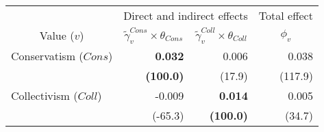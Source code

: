 
\begin{tabular}{lrrr}
\toprule
\multicolumn{1}{c}{ } & \multicolumn{2}{c}{Direct and indirect effects} & \multicolumn{1}{c}{Total effect} \\
\cmidrule(l{3pt}r{3pt}){2-3} \cmidrule(l{3pt}r{3pt}){4-4}
\multicolumn{1}{c}{Value ($v$)} & \multicolumn{1}{c}{$\widetilde{\gamma}^{Cons}_v \times \theta_{Cons}$} & \multicolumn{1}{c}{$\widetilde{\gamma}^{Coll}_v \times \theta_{Coll}$} & \multicolumn{1}{c}{${\phi}_v$}\\
\midrule
Conservatism ($Cons$) & \textbf{0.032} & 0.006 & 0.038\\
 & \textbf{(100.0)} & (17.9) & (117.9)\\
Collectivism ($Coll$) & -0.009 & \textbf{0.014} & 0.005\\
 & (-65.3) & \textbf{(100.0)} & (34.7)\\
\bottomrule
\end{tabular}
